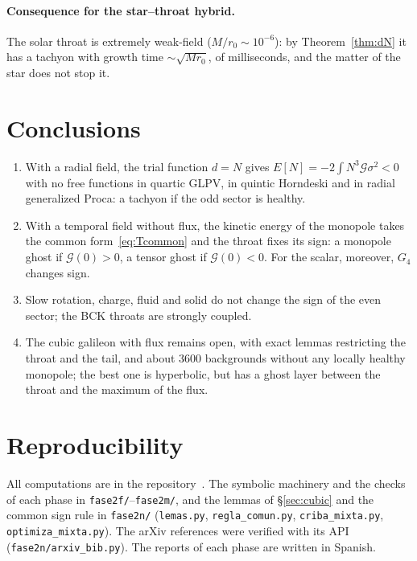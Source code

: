 \documentclass[11pt,a4paper]{article}
\theoremstyle{remark}
\newcommand{\G}{\mathcal G}
\begin{document}
\paragraph{Consequence for the star--throat hybrid.} The solar throat is extremely weak-field ($M/r_0\sim10^{-6}$): by Theorem~\ref{thm:dN} it has a tachyon with growth time $\sim\sqrt{Mr_0}$, of milliseconds, and the matter of the star does not stop it.

\section{Conclusions}

\begin{enumerate}
\item With a radial field, the trial function $d=N$ gives $E[N]=-2\int N^3\G\sigma^2<0$ with no free functions in quartic GLPV, in quintic Horndeski and in radial generalized Proca: a tachyon if the odd sector is healthy.
\item With a temporal field without flux, the kinetic energy of the monopole takes the common form~\eqref{eq:Tcommon} and the throat fixes its sign: a monopole ghost if $\G(0)>0$, a tensor ghost if $\G(0)<0$. For the scalar, moreover, $G_4$ changes sign.
\item Slow rotation, charge, fluid and solid do not change the sign of the even sector; the BCK throats are strongly coupled.
\item The cubic galileon with flux remains open, with exact lemmas restricting the throat and the tail, and about 3600 backgrounds without any locally healthy monopole; the best one is hyperbolic, but has a ghost layer between the throat and the maximum of the flux.
\end{enumerate}

\appendix
\section{Reproducibility}
All computations are in the repository~\cite{repo}. The symbolic machinery and the checks of each phase in \texttt{fase2f/}--\texttt{fase2m/}, and the lemmas of \S\ref{sec:cubic} and the common sign rule in \texttt{fase2n/} (\texttt{lemas.py}, \texttt{regla\_comun.py}, \texttt{criba\_mixta.py}, \texttt{optimiza\_mixta.py}). The arXiv references were verified with its API (\texttt{fase2n/arxiv\_bib.py}). The reports of each phase are written in Spanish.
\end{document}
